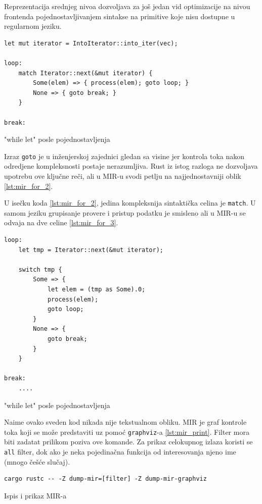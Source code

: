 \documentclass[11pt]{article}
\begin{document}
Reprezentacija srednjeg nivoa dozvoljava za još jedan vid optimizacije na nivou frontenda pojednostavljivanjem
sintakse na primitive koje nisu dostupne u regularnom jeziku.

\begin{listing}[H]
\begin{verbatim}
let mut iterator = IntoIterator::into_iter(vec);

loop:
    match Iterator::next(&mut iterator) {
        Some(elem) => { process(elem); goto loop; }
        None => { goto break; }
    }

break:
\end{verbatim}
\caption{"while let" posle pojednostavljenja}
\label{lst:mir_for_2}
\end{listing}

Izraz \verb|goto| je u inženjerskoj zajednici gledan sa visine jer kontrola toka nakon odredjene kompleksnosti
postaje nerazumljiva. Rust iz istog razloga ne dozvoljava upotrebu ove ključne reči, ali u MIR-u svodi 
petlju na najjednostavniji oblik \ref{lst:mir_for_2}.

\newpage
U isečku koda \ref{lst:mir_for_2}, jedina kompleksnija sintaktička celina je \verb|match|. U samom jeziku 
grupisanje provere i pristup podatku je smisleno ali u MIR-u se odvaja na dve celine \ref{lst:mir_for_3}.

\begin{listing}[H]
\begin{verbatim}
loop:
    let tmp = Iterator::next(&mut iterator);
    
    switch tmp {
        Some => {
            let elem = (tmp as Some).0;
            process(elem);
            goto loop;
        }
        None => {
            goto break;
        }
    }
    
break:
    ....
\end{verbatim}
\caption{"while let" posle pojednostavljenja}
\label{lst:mir_for_3}
\end{listing}

Naime ovako sveden kod nikada nije tekstualnom obliku. MIR je graf kontrole toka koji se može predstaviti
uz pomoć \verb|graphviz|-a \ref{lst:mir_print}. Filter mora biti zadatat prilikom poziva ove komande. 
Za prikaz celokupnog izlaza koristi se \verb|all| filter, dok ako je neka pojedinačna funkcija od interesovanja
njeno ime (mnogo češće slučaj).

\begin{listing}[H]
\begin{verbatim}
cargo rustc -- -Z dump-mir=[filter] -Z dump-mir-graphviz
\end{verbatim}
\caption{Ispis i prikaz MIR-a}
\label{lst:mir_print}
\end{listing}
\end{document}
